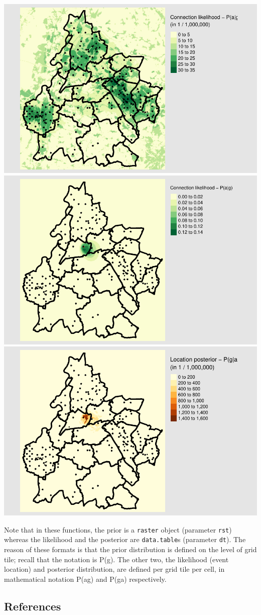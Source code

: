 \documentclass[
]{article}
\begin{document}
\includegraphics[width=0.46\linewidth]{mobvis-mobloc_files/figure-latex/unnamed-chunk-10-1}
\includegraphics[width=0.46\linewidth]{mobvis-mobloc_files/figure-latex/unnamed-chunk-10-2}
\includegraphics[width=0.46\linewidth]{mobvis-mobloc_files/figure-latex/unnamed-chunk-10-3}

Note that in these functions, the prior is a \texttt{raster} object
(parameter \texttt{rst}) whereas the likelihood and the posterior are
\texttt{data.table}s (parameter \texttt{dt}). The reason of these
formats is that the prior distribution is defined on the level of grid
tile; recall that the notation is P(g). The other two, the likelihood
(event location) and posterior distribution, are defined per grid tile
per cell, in mathematical notation P(a\textbar g) and P(g\textbar a)
respectively.

\hypertarget{references}{%
\subsection{References}\label{references}}
\end{document}
